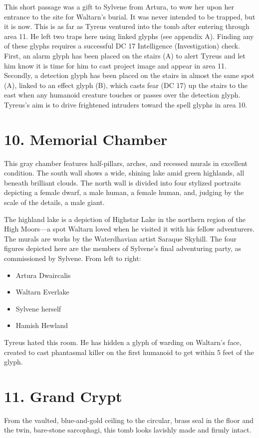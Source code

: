 \documentclass[10pt,a4paper,twoside,twocolumn,openany,bg=print,nodeprecatedcode]{dndbook}
\begin{document}
This short passage was a gift to Sylvene from Artura, to wow her upon her entrance to the site for Waltarn's burial. It was never intended to be trapped, but it is now. This is as far as Tyreus ventured into the tomb after entering through area 11. He left two traps here using linked glyphs (see appendix A). Finding any of these glyphs requires a successful DC 17 Intelligence (Investigation) check.
First, an alarm glyph has been placed on the stairs (A) to alert Tyreus and let him know it is time for him to cast project image and appear in area 11.
Secondly, a detection glyph has been placed on the stairs in almost the same spot (A), linked to an effect glyph (B), which casts fear (DC 17) up the stairs to the east when any humanoid creature touches or passes over the detection glyph.
Tyreus's aim is to drive frightened intruders toward the spell glyphs in area 10.
\section{10. Memorial Chamber}
\begin{DndReadAloud}{}
This gray chamber features half-pillars, arches, and recessed murals in excellent condition. The south wall shows a wide, shining lake amid green highlands, all beneath brilliant clouds. The north wall is divided into four stylized portraits depicting a female dwarf, a male human, a female human, and, judging by the scale of the details, a male giant.
\end{DndReadAloud}

The highland lake is a depiction of Highstar Lake in the northern region of the High Moors—a spot Waltarn loved when he visited it with his fellow adventurers. The murals are works by the Waterdhavian artist Saraque Skyhill.
The four figures depicted here are the members of Sylvene's final adventuring party, as commissioned by Sylvene. From left to right:

\begin{itemize}
\item Artura Dwaircalis
\item Waltarn Everlake
\item Sylvene herself
\item Hamish Hewland
\end{itemize}

Tyreus hated this room. He has hidden a glyph of warding on Waltarn's face, created to cast phantasmal killer on the first humanoid to get within 5 feet of the glyph.
\section{11. Grand Crypt}
\begin{DndReadAloud}{}
From the vaulted, blue-and-gold ceiling to the circular, brass seal in the floor and the twin, bare-stone sarcophagi, this tomb looks lavishly made and firmly intact.
\end{DndReadAloud}
\end{document}
